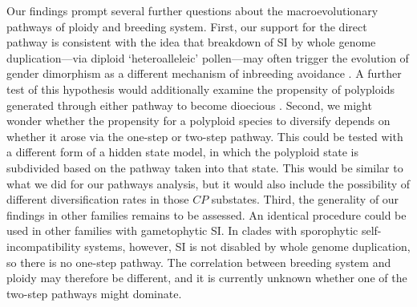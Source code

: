 Our findings prompt several further questions about the macroevolutionary pathways of ploidy and breeding system.
%
First, our support for the direct pathway is consistent with the idea that breakdown of SI by whole genome duplication---via diploid `heteroalleleic' pollen---may often trigger the evolution of gender dimorphism as a different mechanism of inbreeding avoidance \citep{miller_2000}.
A further test of this hypothesis would additionally examine the propensity of polyploids generated through either pathway to become dioecious \citep{robertson_2011}.
%
Second, we might wonder whether the propensity for a polyploid species to diversify depends on whether it arose via the one-step or two-step pathway.
This could be tested with a different form of a hidden state model, in which the polyploid state is subdivided based on the pathway taken into that state.
This would be similar to what we did for our pathways analysis, but it would also include the possibility of different diversification rates in those $CP$ substates.
%
Third, the generality of our findings in other families remains to be assessed.
An identical procedure could be used in other families with gametophytic SI.
In clades with sporophytic self-incompatibility systems, however, SI is not disabled by whole genome duplication, so there is no one-step pathway. %
The correlation between breeding system and ploidy may therefore be different, and it is currently unknown whether one of the two-step pathways might dominate.


